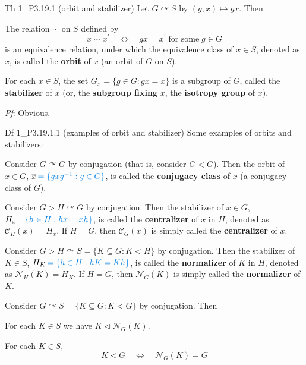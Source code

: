 \documentclass{article}
\newcommand{\nles}{\vartriangleleft}
\newcommand{\act}{\curvearrowright}
\begin{document}
\begin{Th}{Th 1\_P3.19.1 (orbit and stabilizer)}
    Let $G\act S$ by $(g, x)\mapsto gx$. Then 
    \begin{compactenum}
        \item The relation $\sim$ on $S$ defined by
        $$ x\sim x^\prime \quad\Longleftrightarrow\quad gx = x^\prime \;\text{for some}\; g\in G $$
        is an equivalence relation, \textcolor{Df}{under which the equivalence class of $x\in S$, denoted as $\overline{x}$, is called the \textbf{orbit} of $x$ (an orbit of $G$ on $S$).}
        \item For each $x\in S$, the set $G_x = \{g\in G: gx = x\}$ is a subgroup of $G$, \textcolor{Df}{called the \textbf{stabilizer} of $x$ (or, the \textbf{subgroup fixing} $x$, the \textbf{isotropy group} of $x$).}
    \end{compactenum}
    \tcblower
    \textit{Pf}: Obvious.
\end{Th}

\begin{Df}{Df 1\_P3.19.1.1 (examples of orbit and stabilizer)}
    Some examples of orbits and stabilizers:
    \begin{compactenum}
        \item Consider $G\act G$ by conjugation (that is, consider $G<G$). Then the orbit of $x\in G$, $\overline{x}\,\textcolor{Th}{= \{gxg^{-1}: g\in G\}}$, is called the \textbf{conjugacy class} of $x$ (a conjugacy class of $G$).
        \item Consider $G>H\act G$ by conjugation. Then the stabilizer of $x\in G$, $H_x \textcolor{Th}{ = \{h\in H: hx = xh\}}$, is called the \textbf{centralizer} of $x$ in $H$, denoted as $\mathcal{C}_H(x) = H_x$. If $H = G$, then $\mathcal{C}_G(x)$ is simply called the \textbf{centralizer} of $x$.
        \item Consider $G>H\act S = \{K\subseteq G: K<H\}$ by conjugation. Then the stabilizer of $K\in S$, $H_K\,\textcolor{Th}{= \{h\in H: hK = Kh\}}$, is called the \textbf{normalizer} of $K$ in $H$, denoted as $\mathcal{N}_H(K) = H_K$. If $H = G$, then $\mathcal{N}_G(K)$ is simply called the \textbf{normalizer} of $K$.
    \end{compactenum}
\end{Df}

\begin{Rmk}{}
    \textcolor{Th}{Consider $G\act S = \{K\subseteq G: K<G\}$ by conjugation. Then 
    \begin{compactenum}
        \item For each $K\in S$ we have $K\nles \mathcal{N}_G(K)$.
        \item For each $K\in S$, 
        $$ K\nles G \quad\Longleftrightarrow\quad \mathcal{N}_G(K) = G $$
    \end{compactenum}}
\end{Rmk}
\end{document}
